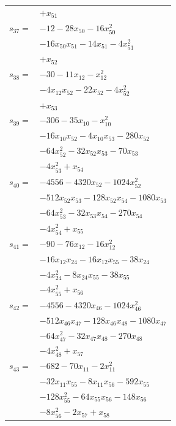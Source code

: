 \begin{longtable}{@{}r@{\;}l@{}}
 & \(\displaystyle +x_{51}\) \\[3pt]
\(s_{37}=\) & \(\displaystyle -12 -28x_{50} -16x_{50}^{2}\) \\
 & \(\displaystyle -16x_{50}x_{51} -14x_{51} -4x_{51}^{2}\) \\
 & \(\displaystyle +x_{52}\) \\[3pt]
\(s_{38}=\) & \(\displaystyle -30 -11x_{12} -x_{12}^{2}\) \\
 & \(\displaystyle -4x_{12}x_{52} -22x_{52} -4x_{52}^{2}\) \\
 & \(\displaystyle +x_{53}\) \\[3pt]
\(s_{39}=\) & \(\displaystyle -306 -35x_{10} -x_{10}^{2}\) \\
 & \(\displaystyle -16x_{10}x_{52} -4x_{10}x_{53} -280x_{52}\) \\
 & \(\displaystyle -64x_{52}^{2} -32x_{52}x_{53} -70x_{53}\) \\
 & \(\displaystyle -4x_{53}^{2} +x_{54}\) \\[3pt]
\(s_{40}=\) & \(\displaystyle -4556 -4320x_{52} -1024x_{52}^{2}\) \\
 & \(\displaystyle -512x_{52}x_{53} -128x_{52}x_{54} -1080x_{53}\) \\
 & \(\displaystyle -64x_{53}^{2} -32x_{53}x_{54} -270x_{54}\) \\
 & \(\displaystyle -4x_{54}^{2} +x_{55}\) \\[3pt]
\(s_{41}=\) & \(\displaystyle -90 -76x_{12} -16x_{12}^{2}\) \\
 & \(\displaystyle -16x_{12}x_{24} -16x_{12}x_{55} -38x_{24}\) \\
 & \(\displaystyle -4x_{24}^{2} -8x_{24}x_{55} -38x_{55}\) \\
 & \(\displaystyle -4x_{55}^{2} +x_{56}\) \\[3pt]
\(s_{42}=\) & \(\displaystyle -4556 -4320x_{46} -1024x_{46}^{2}\) \\
 & \(\displaystyle -512x_{46}x_{47} -128x_{46}x_{48} -1080x_{47}\) \\
 & \(\displaystyle -64x_{47}^{2} -32x_{47}x_{48} -270x_{48}\) \\
 & \(\displaystyle -4x_{48}^{2} +x_{57}\) \\[3pt]
\(s_{43}=\) & \(\displaystyle -682 -70x_{11} -2x_{11}^{2}\) \\
 & \(\displaystyle -32x_{11}x_{55} -8x_{11}x_{56} -592x_{55}\) \\
 & \(\displaystyle -128x_{55}^{2} -64x_{55}x_{56} -148x_{56}\) \\
 & \(\displaystyle -8x_{56}^{2} -2x_{57} +x_{58}\) \\[3pt]

\end{longtable}
